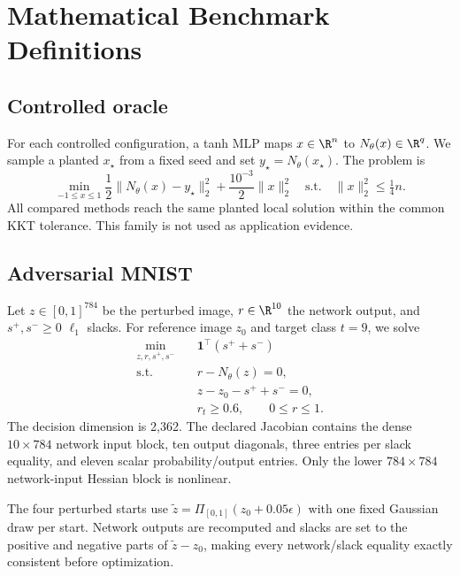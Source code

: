 \section{Mathematical Benchmark Definitions}
\label{app:formulations}

\subsection{Controlled oracle}

For each controlled configuration, a tanh MLP maps $x\in\R^n$ to
$N_\theta(x)\in\R^q$.  We sample a planted $x_\star$ from a fixed seed and set
$y_\star=N_\theta(x_\star)$.  The problem is
\begin{equation}
\min_{-1\leq x\leq1}
\frac{1}{2}\|N_\theta(x)-y_\star\|_2^2
+\frac{10^{-3}}{2}\|x\|_2^2
\quad\text{s.t.}\quad \|x\|_2^2\leq \tfrac14 n.
\end{equation}
All compared methods reach the same planted local solution within the common
KKT tolerance.  This family is not used as application evidence.

\subsection{Adversarial MNIST}

Let $z\in[0,1]^{784}$ be the perturbed image, $r\in\R^{10}$ the network output,
and $s^+,s^-\geq0$ $\ell_1$ slacks.  For reference image $z_0$ and target class
$t=9$, we solve
\begin{equation}
\begin{aligned}
\min_{z,r,s^+,s^-}\quad & \mathbf{1}^\top(s^++s^-)\\
\mathrm{s.t.}\quad &r-N_\theta(z)=0,\\
&z-z_0-s^++s^-=0,\\
&r_t\geq0.6,\qquad 0\leq r\leq1.
\end{aligned}
\label{eq:mnist-app}
\end{equation}
The decision dimension is 2,362.  The declared Jacobian contains the dense
$10\times784$ network input block, ten output diagonals, three entries per
slack equality, and eleven scalar probability/output entries.  Only the lower
$784\times784$ network-input Hessian block is nonlinear.

The four perturbed starts use
$\tilde z=\Pi_{[0,1]}(z_0+0.05\epsilon)$ with one fixed Gaussian draw per
start.  Network outputs are recomputed and slacks are set to the positive and
negative parts of $\tilde z-z_0$, making every network/slack equality exactly
consistent before optimization.

